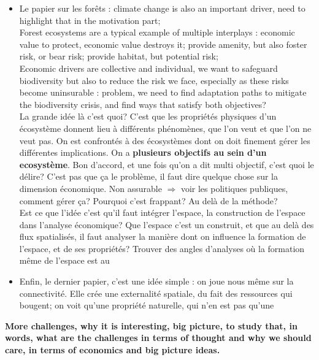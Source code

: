 \begin{itemize}
\item Le papier sur les forêts : climate change is also an important driver, need to highlight that in the motivation part; \\
Forest ecosystems are a typical example of multiple interplays : economic value to protect, economic value destroys it; provide amenity, but also foster risk, or bear risk; provide habitat, but potential risk; \\
Economic drivers are collective and individual, we want to safeguard biodiversity but also to reduce the risk we face, especially as these risks become uninsurable : problem, we need to find adaptation paths to mitigate the biodiversity crisis, and find ways that satisfy both objectives? 
\\
La grande idée là c'est quoi? C'est que les propriétés physiques d'un écosystème donnent lieu à différents phénomènes, que l'on veut et que l'on ne veut pas. On est confrontés à des écosystèmes dont on doit finement gérer les différentes implications. On a \textbf{plusieurs objectifs au sein d'un ecosystème}. Bon d'accord, et une fois qu'on a dit multi objectif, c'est quoi le délire? C'est pas que ça le problème, il faut dire quelque chose sur la dimension économique. Non assurable $\Rightarrow$ voir les politiques publiques, comment gérer ça? Pourquoi c'est frappant? Au delà de la méthode? 
\\
Est ce que l'idée c'est qu'il faut intégrer l'espace, la construction de l'espace dans l'analyse économique? Que l'espace c'est un construit, et que au delà des flux spatialisés, il faut analyser la manière dont on influence la formation de l'espace, et de ses propriétés? Trouver des angles d'analyses où la formation même de l'espace est au 
\\

\item Enfin, le dernier papier, c'est une idée simple : on joue nous même sur la connectivité. Elle crée une externalité spatiale, du fait des ressources qui bougent; on voit qu'une propriété naturelle, qui n'en est pas qu'une 

\end{itemize}




\textbf{More challenges, why it is interesting, big picture, to study that, in words, what are the challenges in terms of thought and why we should care, in terms of economics and big picture ideas.}


